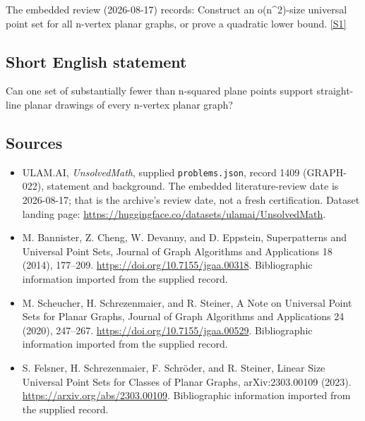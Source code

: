 \documentclass[11pt,a4paper]{article}
\newcommand{\sref}[2]{\hyperlink{source:#1:#2}{[S#2]}}
\begin{document}
The embedded review (2026-08-17) records: Construct an o(n\textasciicircum{}2)-size universal point set for all n-vertex planar graphs, or prove a quadratic lower bound. \sref{1409}{1}

\subsection{Short English statement}

Can one set of substantially fewer than n-squared plane points support straight-line planar drawings of every n-vertex planar graph?

\subsection{Sources}

{\small

\begin{itemize}

\item[\hypertarget{source:1409:1}{S1}] ULAM.AI, \emph{UnsolvedMath}, supplied \texttt{problems.json}, record 1409 (GRAPH-022), statement and background. The embedded literature-review date is 2026-08-17; that is the archive’s review date, not a fresh certification. Dataset landing page: \url{https://huggingface.co/datasets/ulamai/UnsolvedMath}.

\item[\hypertarget{source:1409:2}{S2}] M. Bannister, Z. Cheng, W. Devanny, and D. Eppstein, Superpatterns and Universal Point Sets, Journal of Graph Algorithms and Applications 18 (2014), 177–209. \url{https://doi.org/10.7155/jgaa.00318}. Bibliographic information imported from the supplied record.

\item[\hypertarget{source:1409:3}{S3}] M. Scheucher, H. Schrezenmaier, and R. Steiner, A Note on Universal Point Sets for Planar Graphs, Journal of Graph Algorithms and Applications 24 (2020), 247–267. \url{https://doi.org/10.7155/jgaa.00529}. Bibliographic information imported from the supplied record.

\item[\hypertarget{source:1409:4}{S4}] S. Felsner, H. Schrezenmaier, F. Schröder, and R. Steiner, Linear Size Universal Point Sets for Classes of Planar Graphs, arXiv:2303.00109 (2023). \url{https://arxiv.org/abs/2303.00109}. Bibliographic information imported from the supplied record.

\end{itemize}

}

\label{end:1409}
\end{document}
